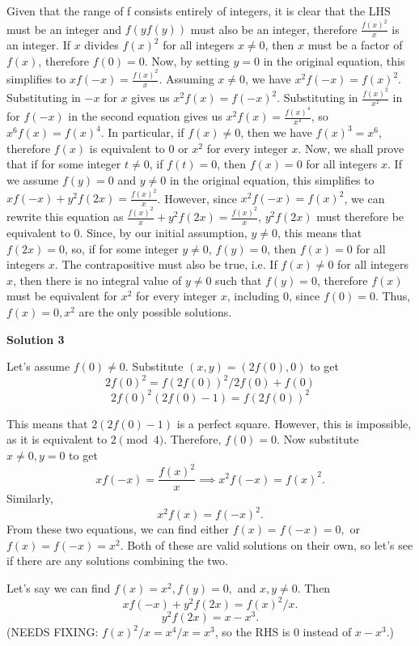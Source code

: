 \begin{enumerate}
Given that the range of f consists entirely of integers, it is clear that the LHS must be an integer and $f(yf(y))$ must also be an integer, therefore $\frac{f(x)^2}{x}$ is an integer. If $x$ divides $f(x)^2$ for all integers $x \ne 0$, then $x$ must be a factor of $f(x)$, therefore $f(0)=0$. Now, by setting $y=0$ in the original equation, this simplifies to $xf(-x)=\frac{f(x)^2}{x}$. Assuming $x \ne 0$, we have $x^2f(-x)=f(x)^2$. Substituting in $-x$ for $x$ gives us $x^2f(x)=f(-x)^2$. Substituting in $\frac{f(x)^2}{x^2}$ in for $f(-x)$ in the second equation gives us $x^2f(x)=\frac{f(x)^4}{x^4}$, so $x^6f(x)=f(x)^4$. In particular, if $f(x) \ne 0$, then we have $f(x)^3=x^6$, therefore $f(x)$ is equivalent to $0$ or $x^2$ for every integer $x$. Now, we shall prove that if for some integer $t \ne 0$, if $f(t)=0$, then $f(x)=0$ for all integers $x$. If we assume $f(y)=0$ and $y \ne 0$ in the original equation, this simplifies to $xf(-x)+y^2f(2x)=\frac{f(x)^2}{x}$. However, since $x^2f(-x)=f(x)^2$, we can rewrite this equation as $\frac{f(x)^2}{x}+y^2f(2x)=\frac{f(x)^2}{x}$, $y^2f(2x)$ must therefore be equivalent to $0$. Since, by our initial assumption, $y \ne 0$, this means that $f(2x)=0$, so, if for some integer $y \ne 0$, $f(y)=0$, then $f(x)=0$ for all integers $x$. The contrapositive must also be true, i.e. If $f(x) \ne 0$ for all integers $x$, then there is no integral value of $y \ne 0$ such that $f(y)=0$, therefore $f(x)$ must be equivalent for $x^2$ for every integer $x$, including $0$, since $f(0)=0$. Thus, $f(x)=0, x^2$ are the only possible solutions.

 



\textbf{Solution 3}

Let's assume $f(0)\neq 0.$ Substitute $(x,y)=(2f(0),0)$ to get 
 \[2f(0)^2=f(2f(0))^2/2f(0)+f(0)\]
 \[2f(0)^2(2f(0)-1)=f(2f(0))^2\]

 This means that $2(2f(0)-1)$ is a perfect square. However, this is impossible, as it is equivalent to $2\pmod{4}.$ Therefore, $f(0)=0.$ Now substitute $x\neq 0, y=0$ to get 
 \[xf(-x)=\frac{f(x)^2}{x} \implies x^2f(-x)=f(x)^2.\]Similarly, 
 \[x^2f(x)=f(-x)^2.\]From these two equations, we can find either $f(x)=f(-x)=0,$ or $f(x)=f(-x)=x^2.$ Both of these are valid solutions on their own, so let's see if there are any solutions combining the two. 

 Let's say we can find $f(x)=x^2, f(y)=0,$ and $x,y\neq 0.$ Then 
 \[xf(-x)+y^2f(2x)=f(x)^2/x.\]
 \[y^2f(2x)=x-x^3.\] (NEEDS FIXING: $f(x)^2/x= x^4/x = x^3$, so the RHS is $0$ instead of $x-x^3$.)


\end{enumerate}

